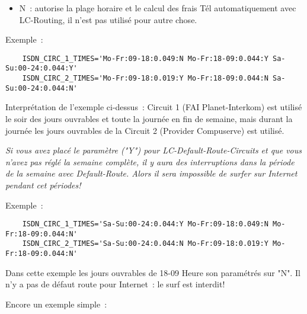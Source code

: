 \begin{description}
\begin{enumerate}
\begin{itemize}
    \item N~: autorise la plage horaire et le calcul des frais Tél automatiquement
      avec LC-Routing, il n'est pas utilisé pour autre chose.
    \end{itemize}
  \end{enumerate}

    Exemple~:

\begin{small}
\begin{example}
\begin{verbatim}
    ISDN_CIRC_1_TIMES='Mo-Fr:09-18:0.049:N Mo-Fr:18-09:0.044:Y Sa-Su:00-24:0.044:Y'
    ISDN_CIRC_2_TIMES='Mo-Fr:09-18:0.019:Y Mo-Fr:18-09:0.044:N Sa-Su:00-24:0.044:N'
\end{verbatim}
\end{example}
\end{small}

    Interprétation de l'exemple ci-dessus~: Circuit 1 (FAI Planet-Interkom) est utilisé
    le soir des jours ouvrables et toute la journée en fin de semaine, mais durant la
    journée les jours ouvrables de la Circuit 2 (Provider Compuserve) est utilisé.

    \begin{description}
    \item {}

     \emph{Si vous avez placé le paramètre ("Y") pour LC-Default-Route-Circuits et que vous
     n'avez pas réglé la semaine complète, il y aura des interruptions dans la période
     de la semaine avec Default-Route. Alors il sera impossible de surfer sur Internet
     pendant cet périodes!}

    \item Exemple~:
\begin{example}
\begin{verbatim}
    ISDN_CIRC_1_TIMES='Sa-Su:00-24:0.044:Y Mo-Fr:09-18:0.049:N Mo-Fr:18-09:0.044:N'
    ISDN_CIRC_2_TIMES='Sa-Su:00-24:0.044:N Mo-Fr:09-18:0.019:Y Mo-Fr:18-09:0.044:N'
\end{verbatim}
\end{example}

     Dans cette exemple les jours ouvrables de 18-09 Heure son paramétrés sur "N".
     Il n'y a pas de défaut route pour Internet~: le surf est interdit!

    \item Encore un exemple simple~:


\end{description}
\end{description}
